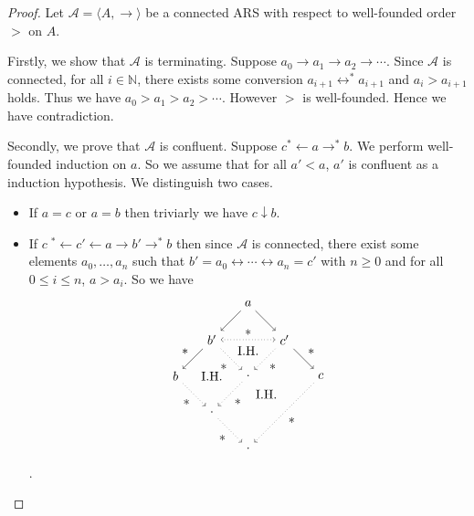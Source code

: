 \documentclass[autodetect-enginem]{article}
\theoremstyle{plain}
\theoremstyle{definition}
\begin{document}
\begin{proof}
    Let $\mathcal{A} = \langle A, \to \rangle$ be a connected ARS with respect to well-founded order $>$ on $A$.
    
    Firstly, we show that $\mathcal{A}$ is terminating.
    Suppose $a_0 \to a_1 \to a_2 \to \cdots$.
    Since $\mathcal{A}$ is connected, for all $i \in \mathbb{N}$,
    there exists some conversion $a_{i+1} \leftrightarrow^* a_{i+1}$ and $a_i > a_{i+1}$ holds.
    Thus we have $a_0 > a_1 > a_2 > \cdots$.
    However $>$ is well-founded. Hence we have contradiction.

    Secondly, we prove that $\mathcal{A}$ is confluent.
    Suppose $c$$^*\!\!\leftarrow a \rightarrow^* b$.
    We perform well-founded induction on $a$.
    So we assume that for all $a' < a$, $a'$ is confluent as a induction hypothesis.    
    We distinguish two cases.
    \begin{itemize}
        \item If $a = c$ or $a = b$ then triviarly we have $c \downarrow b$.
        \item If $c\;$$^*\!\!\!\leftarrow c' \leftarrow a \rightarrow b' \to^* b$ then since $\mathcal{A}$ is connected,
            there exist some elements $a_0, \dots, a_n$ such that $b' = a_0 \leftrightarrow \cdots \leftrightarrow a_n = c'$ with $n \geq 0$ and
            for all $0 \leq i \leq n$, $a > a_i$.
            So we have
            \[
                \begin{tikzpicture}[auto]
                    \node(a) at (0,0) {$a$}; \node (b') at (-1,-1) {$b'$}; \node (c') at (1,-1) {$c'$};
                    \node(b) at (-2,-2) {$b$}; \node (c) at (2,-2) {$c$};
                    \node(d') at (0,-2) {$\cdot$}; \node(d'') at (-1,-3) {$\cdot$};
                    \node(d) at (0,-4) {$\cdot$};
                    \node(IH) at (0, -1.3) {I.H.};
                    \node(IH2) at (-1, -2) {I.H.};
                    \node(IH3) at (0.5, -2.5) {I.H.};
                    \draw[->] (a) to (b');
                    \draw[->] (a) to (c');
                    \draw[->] (b') to node[swap]{$*$}(b);
                    \draw[->] (c') to node{$*$}(c);
                    \draw[<->, dotted] (b') to node{$*$}(c');
                    \draw[->, dotted] (b') to node[swap]{$*$}(d');
                    \draw[->, dotted] (c') to node{$*$}(d');
                    \draw[->, dotted] (b) to node[swap]{$*$}(d'');
                    \draw[->, dotted] (d') to node{$*$}(d'');
                    \draw[->, dotted] (d'') to node[swap]{$*$}(d);
                    \draw[->, dotted] (c) to node{$*$}(d);
                \end{tikzpicture}
            \].
    \end{itemize}

\end{proof}
\end{document}
